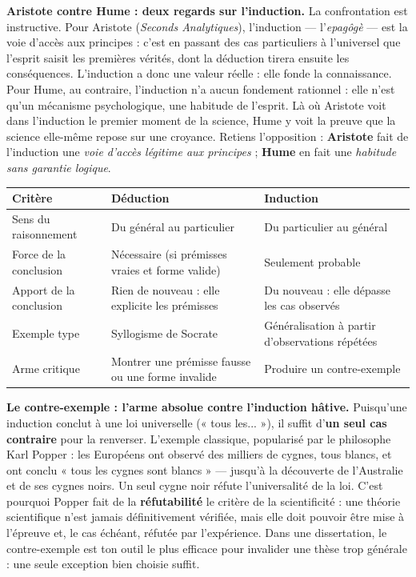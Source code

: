 \documentclass[11pt]{article}
\begin{document}
\textbf{Aristote contre Hume : deux regards sur l'induction.} La confrontation est instructive. Pour Aristote (\emph{Seconds Analytiques}), l'induction — l'\emph{epagôgè} — est la voie d'accès aux principes : c'est en passant des cas particuliers à l'universel que l'esprit saisit les premières vérités, dont la déduction tirera ensuite les conséquences. L'induction a donc une valeur réelle : elle fonde la connaissance. Pour Hume, au contraire, l'induction n'a aucun fondement rationnel : elle n'est qu'un mécanisme psychologique, une habitude de l'esprit. Là où Aristote voit dans l'induction le premier moment de la science, Hume y voit la preuve que la science elle-même repose sur une croyance. Retiens l'opposition : \textbf{Aristote} fait de l'induction une \emph{voie d'accès légitime aux principes} ; \textbf{Hume} en fait une \emph{habitude sans garantie logique}.

\begin{center}
\begin{tabularx}{\linewidth}{|l|X|X|}
\hline
\rowcolor{popblueL} \textbf{Critère} & \textbf{Déduction} & \textbf{Induction} \\
\hline
Sens du raisonnement & Du général au particulier & Du particulier au général \\
\hline
Force de la conclusion & Nécessaire (si prémisses vraies et forme valide) & Seulement probable \\
\hline
Apport de la conclusion & Rien de nouveau : elle explicite les prémisses & Du nouveau : elle dépasse les cas observés \\
\hline
Exemple type & Syllogisme de Socrate & Généralisation à partir d'observations répétées \\
\hline
Arme critique & Montrer une prémisse fausse ou une forme invalide & Produire un contre-exemple \\
\hline
\end{tabularx}
\end{center}

\textbf{Le contre-exemple : l'arme absolue contre l'induction hâtive.} Puisqu'une induction conclut à une loi universelle (« tous les... »), il suffit d'\textbf{un seul cas contraire} pour la renverser. L'exemple classique, popularisé par le philosophe Karl Popper : les Européens ont observé des milliers de cygnes, tous blancs, et ont conclu « tous les cygnes sont blancs » — jusqu'à la découverte de l'Australie et de ses cygnes noirs. Un seul cygne noir réfute l'universalité de la loi. C'est pourquoi Popper fait de la \textbf{réfutabilité} le critère de la scientificité : une théorie scientifique n'est jamais définitivement vérifiée, mais elle doit pouvoir être mise à l'épreuve et, le cas échéant, réfutée par l'expérience. Dans une dissertation, le contre-exemple est ton outil le plus efficace pour invalider une thèse trop générale : une seule exception bien choisie suffit.
\end{document}
